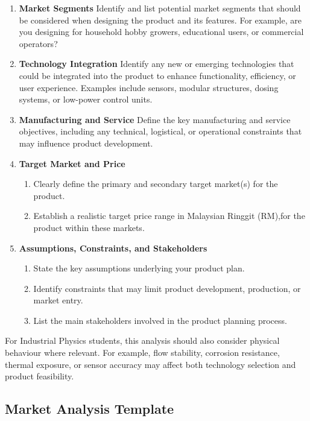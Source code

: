 \begin{enumerate}

\item \textbf{Market Segments}
Identify and list potential market segments that should be considered when designing the product and its features. For example, are you designing for household hobby growers, educational users, or commercial operators?

\item \textbf{Technology Integration}
Identify any new or emerging technologies that could be integrated into the product to enhance functionality, efficiency, or user experience. Examples include sensors, modular structures, dosing systems, or low-power control units.

\item \textbf{Manufacturing and Service}
Define the key manufacturing and service objectives, including any technical, logistical, or operational constraints that may influence product development.

\item \textbf{Target Market and Price}
\begin{enumerate}
    \item Clearly define the primary and secondary target market(s) for the product.
    \item Establish a realistic target price range in Malaysian Ringgit (RM),for the product within these markets.
\end{enumerate}

\item \textbf{Assumptions, Constraints, and Stakeholders}
\begin{enumerate}
    \item State the key assumptions underlying your product plan.
    \item Identify constraints that may limit product development, production, or market entry.
    \item List the main stakeholders involved in the product planning process.
\end{enumerate}

\end{enumerate}


For Industrial Physics students, this analysis should also consider physical behaviour where relevant. For example, flow stability, corrosion resistance, thermal exposure, or sensor accuracy may affect both technology selection and product feasibility.

\subsection{Market Analysis Template}

